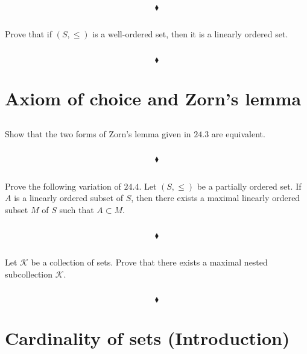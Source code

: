 $$\blacklozenge$$

\subsection{}
\begin{tcolorbox}
Prove that if $(S,\leq)$  is a well-ordered set, then it is a linearly ordered set. 
\end{tcolorbox}
$$ $$

$$\blacklozenge$$



\newpage

 \section{Axiom of choice and Zorn's lemma}
\subsection{}
\begin{tcolorbox}
Show that the two forms of Zorn's lemma given in $\mathbf{24.3}$ are equivalent. 
\end{tcolorbox}
$$ $$

$$\blacklozenge$$

\subsection{}
\begin{tcolorbox}
Prove the following variation of $\mathbf{24.4}$. Let $(S, \leq)$ be a partially ordered set. If $A$ is a linearly ordered subset of $S$, then there exists a maximal linearly ordered subset $M$ of $S$ such that $A\subset M$.  

\end{tcolorbox}
$$ $$

$$\blacklozenge$$

\subsection{}
\begin{tcolorbox}
Let $\mathscr{K}$ be a collection of sets. Prove that there exists a maximal nested subcollection $\mathscr{K}$. 
\end{tcolorbox}
$$ $$

$$\blacklozenge$$

\newpage

 \section{Cardinality of sets (Introduction)}
